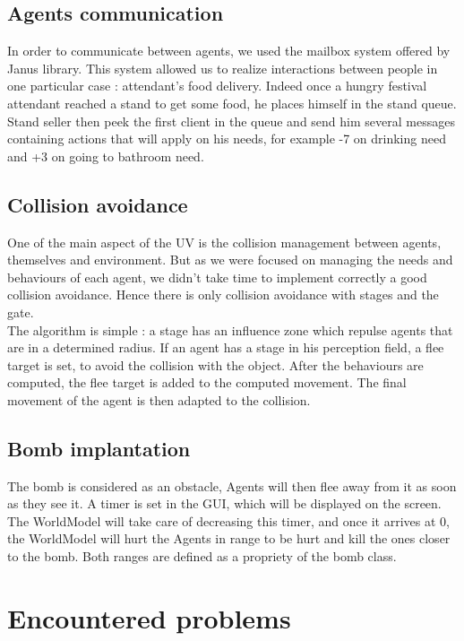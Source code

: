 \subsection{Agents communication}

In order to communicate between agents, we used the mailbox system offered by
Janus library. This system allowed us to realize interactions between people in
one particular case : attendant’s food delivery. Indeed once a hungry festival
attendant reached a stand to get some food, he places himself in the stand
queue. Stand seller then peek the first client in the queue and send him several
messages containing actions that will apply on his needs, for example -7 on
drinking need and +3 on going to bathroom need.

\subsection{Collision avoidance}

One of the main aspect of the UV is the collision management between agents,
themselves and environment. But as we were focused on managing the needs and
behaviours of each agent, we didn’t take time to implement correctly a good
collision avoidance. Hence there is only collision avoidance with stages and the
gate.\\

The algorithm is simple : a stage has an influence zone which repulse agents
that are in a determined radius. If an agent has a stage in his perception
field, a flee target is set, to avoid the collision with the object. After the
behaviours are computed, the flee target is added to the computed movement. The
final movement of the agent is then adapted to the collision.

\subsection{Bomb implantation}

The bomb is considered as an obstacle, Agents will then flee away from it as soon as they see it. A timer is set in the GUI, which will be displayed on the screen. The WorldModel will take care of decreasing this timer, and once it arrives at 0, the WorldModel will hurt the Agents in range to be hurt and kill the ones closer to the bomb. Both ranges are defined as a propriety of the bomb class.

\section{Encountered problems}

